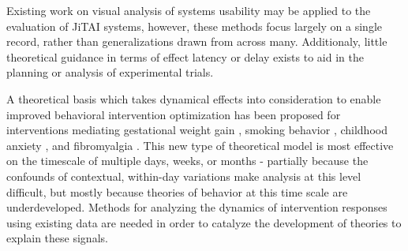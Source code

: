 Existing work on visual analysis of systems usability \cite{harrison1994} may be applied to the evaluation of JiTAI systems, however, these methods focus largely on a single record, rather than generalizations drawn from across many.
Additionaly, little theoretical guidance in terms of effect latency or delay exists to aid in the planning or analysis of experimental trials.

A theoretical basis which takes dynamical effects into consideration to enable improved behavioral intervention optimization has been proposed for interventions mediating gestational weight gain \cite{dong2013}, smoking behavior \cite{timms2014}, childhood anxiety \cite{pina2014}, and fibromyalgia \cite{deshpande2014}.
This new type of theoretical model is most effective on the timescale of multiple days, weeks, or months - partially because the confounds of contextual, within-day variations make analysis at this level difficult, but mostly because theories of behavior at this time scale are underdeveloped.
Methods for analyzing the dynamics of intervention responses using existing data are needed in order to catalyze the development of theories to explain these signals. 
